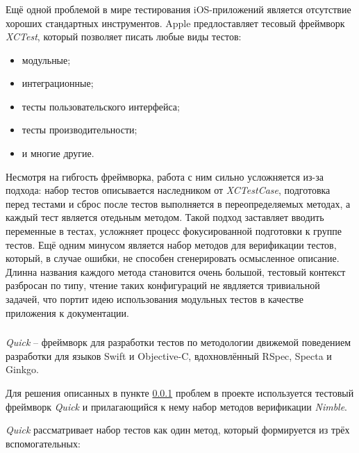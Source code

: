 \subsubsection{}
\label{sec:testing:tech:xctest}

Ещё одной проблемой в мире тестирования iOS-приложений является отсутствие хороших стандартных инструментов. Apple предлоставляет тесовый фреймворк \textit{XCTest}, который позволяет писать любые виды тестов:

\begin{itemize}
	\item модульные;
	\item интеграционные;
	\item тесты пользовательского интерфейса;
	\item тесты производительности;
	\item и многие другие.
\end{itemize}

Несмотря на гибгость фреймворка, работа с ним сильно усложняется из-за подхода: набор тестов описывается наследником от \textit{XCTestCase}, подготовка перед тестами и сброс после тестов выполняется в переопределяемых методах, а каждый тест является отедьным методом. Такой подход заставляет вводить переменные в тестах, усложняет процесс фокусированной подготовки к группе тестов. Ещё одним минусом является набор методов для верификации тестов, который, в случае ошибки, не способен сгенерировать осмысленное описание. Длинна названия каждого метода становится очень большой, тестовый контекст разбросан по типу, чтение таких конфигураций не явдляется тривиальной задачей, что портит идею использования модульных тестов в качестве приложения к документации.

\subsubsection{}
\label{sec:testing:tech:quick}
\textit{Quick} -- фреймворк для разработки тестов по методологии движемой поведением разработки для языков Swift и Objective-C, вдохновлённый RSpec, Specta и Ginkgo. \cite{github:quick}

Для решения описанных в пункте \ref{sec:testing:tech:xctest} проблем в проекте используется тестовый фреймворк \textit{Quick} и прилагающийся к нему набор методов верификации \textit{Nimble}.

\textit{Quick} рассматривает набор тестов как один метод, который формируется из трёх вспомогательных:


